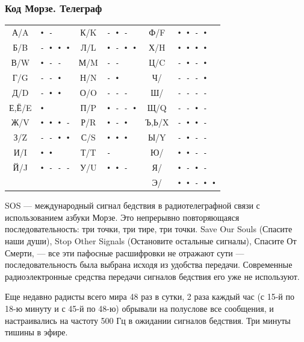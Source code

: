 \begin{frame}
    \frametitle{Код Морзе. Телеграф}
    
    \begin{center}
        \begin{tabular}{cl|cl|cl}
            \hline
            А/A   & \verb"• -    " & К/K & \verb"- • -  " & Ф/F   & \verb"• • - •  " \\
            Б/B   & \verb"- • • •" & Л/L & \verb"• - • •" & Х/H   & \verb"• • • •  " \\
            В/W   & \verb"• - -  " & М/M & \verb"- -    " & Ц/C   & \verb"- • - •  " \\
            Г/G   & \verb"- - •  " & Н/N & \verb"- •    " & Ч/    & \verb"- - - •  " \\
            Д/D   & \verb"- • •  " & О/O & \verb"- - -  " & Ш/    & \verb"- - - -  " \\
            Е,Ё/E & \verb"•      " & П/P & \verb"• - - •" & Щ/Q   & \verb"- - • -  " \\
            Ж/V   & \verb"• • • -" & Р/R & \verb"• - •  " & Ъ,Ь/X & \verb"- • • -  " \\
            З/Z   & \verb"- - • •" & С/S & \verb"• • •  " & Ы/Y   & \verb"- • - -  " \\
            И/I   & \verb"• •    " & Т/T & \verb"-      " & Ю/    & \verb"• • - -  " \\
            Й/J   & \verb"• - - -" & У/U & \verb"• • -  " & Я/    & \verb"• - • -  " \\
                  &                &     &                & Э/    & \verb"• • - • •" \\
            \hline
        \end{tabular}
    \end{center}
\end{frame}

SOS --- международный сигнал бедствия в радиотелеграфной связи с использованием азбуки Морзе. Это непрерывно повторяющаяся последовательность: три точки, три тире, три точки. Save Our Souls (Спасите наши души), Stop Other Signals (Остановите остальные сигналы), Спасите От Смерти, --- все эти пафосные расшифровки не отражают сути --- последовательность была выбрана исходя из удобства передачи. Современные радиоэлектронные средства передачи сигналов бедствия его уже не используют. 

Еще недавно радисты всего мира 48 раз в сутки, 2 раза каждый час (с 15-й по 18-ю минуту и с 45-й по 48-ю) обрывали на полуслове все сообщения, и настраивались на частоту 500 Гц в ожидании сигналов бедствия. Три минуты тишины в эфире.

